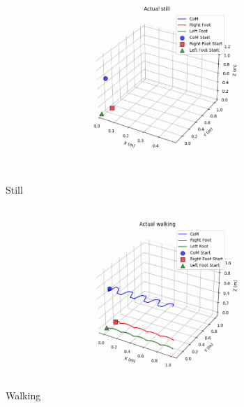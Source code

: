 \documentclass[main.tex]{subfiles}
\begin{document}
\begin{figure}[H]
  \begin{minipage}[b]{0.55\linewidth}
    \centering
    \includegraphics[width=\linewidth]{figures/still.PNG}
    \caption{Still}
    \label{fig:strob}
  
  \end{minipage}
  \hspace{0.05\linewidth}
  \begin{minipage}[b]{0.55\linewidth}
    \centering
    \includegraphics[width=\linewidth]{figures/walking.PNG}
    \caption{Walking}
    \label{fig:walrob}
  
  \end{minipage}
\end{figure}
\end{document}

